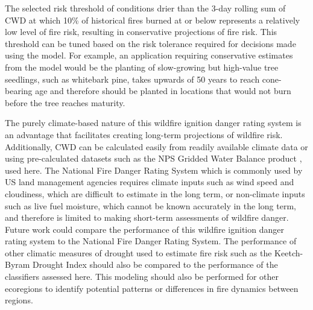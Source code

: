 \documentclass[11pt]{article}
\begin{document}
The selected risk threshold of conditions drier than the 3-day rolling sum of CWD at which 10\% of historical fires burned at or below represents a relatively low level of fire risk, resulting in conservative projections of fire risk.  This threshold can be tuned based on the risk tolerance required for decisions made using the model.  For example, an application requiring conservative estimates from the model would be the planting of slow-growing but high-value tree seedlings, such as whitebark pine, takes upwards of 50 years to reach cone-bearing age and therefore should be planted in locations that would not burn before the tree reaches maturity.


The purely climate-based nature of this wildfire ignition danger rating system is an advantage that facilitates creating long-term projections of wildfire risk. Additionally, CWD can be calculated easily from readily available climate data or using pre-calculated datasets such as the NPS Gridded Water Balance product \citep{tercekHistoricalChangesPlant2021}, used here. The National Fire Danger Rating System \citep{degrootChapter11Wildland2015} which is commonly used by US land management agencies requires climate inputs such as wind speed and cloudiness, which are difficult to estimate in the long term, or non-climate inputs such as live fuel moisture, which cannot be known accurately in the long term, and therefore is limited to making short-term assessments of wildfire danger. Future work could compare the performance of this wildfire ignition danger rating system to the National Fire Danger Rating System. The performance of other climatic measures of drought used to estimate fire risk such as the Keetch-Byram Drought Index \citep{degrootChapter11Wildland2015} should also be compared to the performance of the classifiers assessed here.  This modeling should also be performed for other ecoregions to identify potential patterns or differences in fire dynamics between regions. 
\end{document}

